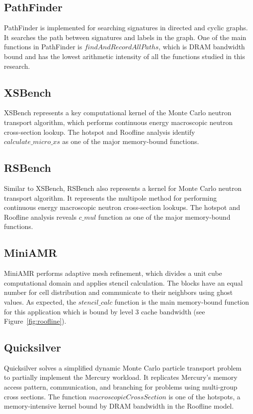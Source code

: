 \subsection{PathFinder}
PathFinder is implemented for searching signatures in directed and cyclic graphs. It searches the path between signatures and labels in the graph. One of the main functions in PathFinder is $findAndRecordAllPaths$, which is DRAM bandwidth bound and has the lowest arithmetic intensity of all the functions studied in this research. 

\subsection{XSBench}
XSBench represents a key computational kernel of the Monte Carlo neutron transport algorithm, which performs continuous energy macroscopic neutron cross-section lookup. The hotspot and Roofline analysis identify $calculate\_micro\_xs$ as one of the major memory-bound functions. 

\subsection{RSBench}
Similar to XSBench, RSBench also represents a kernel for Monte Carlo neutron transport algorithm. It represents the multipole method for performing continuous energy macroscopic neutron cross-section lookups. The hotspot and Roofline analysis reveals $c\_mul$ function as one of the major memory-bound functions.

\subsection{MiniAMR}
MiniAMR performs adaptive mesh refinement, which divides a unit cube computational domain and applies stencil calculation. The blocks have an equal number for cell distribution and communicate to their neighbors using ghost values. As expected, the $stencil\_calc$ function is the main memory-bound function for this application which is bound by level 3 cache bandwidth (see Figure~\ref{fig:roofline}). 

\subsection{Quicksilver}
Quicksilver solves a simpliﬁed dynamic Monte Carlo particle transport problem to partially implement the Mercury workload. It replicates Mercury's memory access pattern, communication, and branching for problems using multi-group cross sections. The function $macroscopicCrossSection$ is one of the hotspots, a memory-intensive kernel bound by DRAM bandwidth in the Roofline model.


